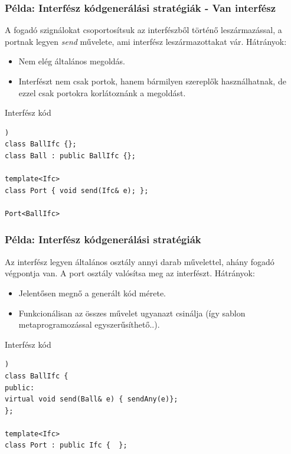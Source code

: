 \documentclass[11pt]{beamer}
\begin{document}
\begin{frame}[fragile]
	\frametitle{Példa: Interfész kódgenerálási stratégiák - Van interfész}
	
	A fogadó szignálokat csoportosítsuk az interfészből történő leszármazással, a portnak legyen \textit{send} művelete, ami interfész leszármazottakat vár.
	Hátrányok:
	\begin{itemize}
	\item Nem elég általános megoldás.
	\item Interfészt nem csak portok, hanem bármilyen szereplők használhatnak, de ezzel csak portokra korlátoznánk a megoldást.
	\end{itemize}
	
		\begin{block}{Interfész kód}
	\begin{lstlisting}[basicstyle=\small])
class BallIfc {};
class Ball : public BallIfc {};

template<Ifc>
class Port { void send(Ifc& e); };

Port<BallIfc>
	\end{lstlisting}
	\end{block}

\end{frame}

\begin{frame}[fragile]
	\frametitle{Példa: Interfész kódgenerálási stratégiák}
	
	Az interfész legyen általános osztály annyi darab művelettel, ahány fogadó végpontja van. A port osztály valósítsa meg az interfészt. 
	Hátrányok:
	\begin{itemize}
	\item Jelentősen megnő a generált kód mérete.
	\item Funkcionálisan az összes művelet ugyanazt csinálja (így sablon metaprogramozással egyszerűsíthető..).
	\end{itemize}
	
	\begin{block}{Interfész kód}
	\begin{lstlisting}[basicstyle=\small])
class BallIfc {
public:
virtual void send(Ball& e) { sendAny(e)}; 
};

template<Ifc>
class Port : public Ifc {  };
	\end{lstlisting}
	\end{block}

\end{frame}
\end{document}
